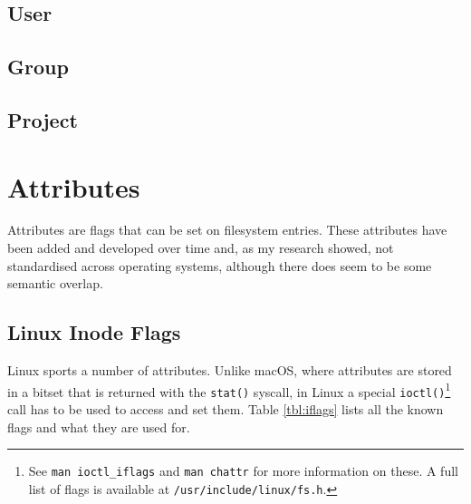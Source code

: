 \documentclass[a4paper]{article}
\begin{document}
\subsection{User}

\subsection{Group}

\subsection{Project}


\section{Attributes}

Attributes are flags that can be set on filesystem entries. These attributes have been added and developed over time and, as my research showed, not standardised across operating systems, although there does seem to be some semantic overlap.

\subsection{Linux Inode Flags}

Linux sports a number of attributes. Unlike macOS, where attributes are stored in a bitset that is returned with the \verb|stat()| syscall, in Linux a special \verb|ioctl()|\footnote{See \texttt{man ioctl\_iflags} and \texttt{man chattr} for more information on these. A full list of flags is available at \texttt{/usr/include/linux/fs.h}.} call has to be used to access and set them. Table \ref{tbl:iflags} lists all the known flags and what they are used for.

\end{document}
